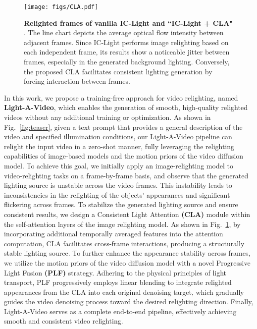 \begin{figure}
\centering
\texttt{[image: figs/CLA.pdf]}
\vspace{-2em}
\caption{{\bf Relighted frames of vanilla IC-Light and ``IC-Light + CLA" }. 
The line chart depicts the average optical flow intensity between adjacent frames. Since IC-Light performs image relighting based on each independent frame, its results show a noticeable jitter between frames, especially in the generated background lighting. Conversely, the proposed CLA facilitates consistent lighting generation by forcing interaction between frames.
}
\label{fig:cla}
\vspace{-1.5em}
\end{figure}
In this work, we propose a training-free approach for video relighting,
named \textbf{Light-A-Video}, which enables the generation of smooth, high-quality relighted videos
without any additional training or optimization. 
As shown in Fig.~\ref{fig:teaser}, given a text prompt that provides a general description of the video and 
specified illumination conditions, 
our Light-A-Video pipeline can relight the input video in a zero-shot manner,
fully leveraging the relighting capabilities of image-based models and the motion priors of the video diffusion model.
To achieve this goal, we initially apply an image-relighting model to video-relighting tasks on a frame-by-frame basis,
and observe that the generated lighting source is unstable across the video frames.
This instability leads to inconsistencies in the relighting of the objects' appearances and significant flickering across frames.
To stabilize the generated lighting source and ensure consistent results, we design a
Consistent Light Attention \textbf{(CLA)} module within the self-attention layers of the image relighting model. 
As shown in Fig.~\ref{fig:cla},
by incorporating additional temporally averaged features into the attention computation,
CLA facilitates cross-frame interactions, producing a structurally stable lighting source.
To further enhance the appearance stability across frames,
we utilize the motion priors of the video diffusion model with a novel Progressive Light Fusion \textbf{(PLF)} strategy.
Adhering to the physical principles of light transport,
PLF progressively employs linear blending to integrate relighted appearances from the CLA 
into each original denoising target, 
which gradually guides the video denoising process toward the desired relighting direction.
Finally, Light-A-Video serves as a complete end-to-end pipeline, effectively achieving smooth and consistent video relighting.
